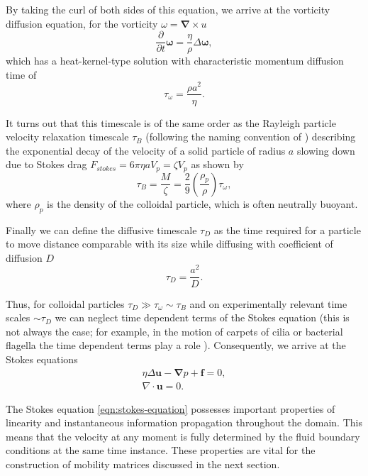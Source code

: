 \documentclass{doctoral}
\newcommand{\pd}{\partial}
\begin{document}
By taking the curl of both sides of this equation, we arrive at the vorticity diffusion equation, for the vorticity $\omega = \bm{\nabla} \times u$
\begin{equation}
    \frac{\pd}{\pd t} \bm{\omega}  = \frac{\eta}{\rho} \Delta \bm{\omega} , \label{eqn:vorticity-diffusion}
\end{equation}
which has a heat-kernel-type solution with characteristic momentum diffusion time of
\begin{equation}
    \tau_\omega = \frac{\rho a^2}{\eta}.
    \label{eqn:vorticity-timescale}
\end{equation}

It turns out that this timescale is of the same order as the Rayleigh particle velocity relaxation timescale $\tau_B$ (following the naming convention of \textcite{vanKampen_2011}) describing the exponential decay of the velocity of a solid particle of radius $a$ slowing down due to Stokes drag $F_{stokes} = 6 \pi \eta a V_p = \zeta V_p$ as shown by
\begin{equation}
    \tau_B = \frac{M}{\zeta} = \frac{2}{9} \left( \frac{\rho_p}{\rho} \right) \tau_\omega, \label{eqn:raighley-timescale}
\end{equation}
where $\rho_p$ is the density of the colloidal particle, which is often neutrally buoyant.

Finally we can define the diffusive timescale $\tau_D$ as the time required for a particle to move distance comparable with its size while diffusing with coefficient of diffusion $D$
\begin{equation}
    \tau_D = \frac{a^2}{D}.
    \label{eqn:diffusive-timescale}
\end{equation}

Thus, for colloidal particles $\tau_D \gg \tau_\omega \sim \tau_B$ and on experimentally relevant time scales $\sim \tau_D$ we can neglect time dependent terms of the Stokes equation (this is not always the case; for example, in the motion of carpets of cilia or bacterial flagella the time dependent terms play a role \cite{Wei_2021}).
Consequently, we arrive at the Stokes equations
\begin{eqnarray}
    \eta \Delta \bm{u} - \bm{\nabla} p + \bm{f} = 0, \label{eqn:stokes-equation} \\
    \nabla \cdot \bm{u} = 0.
\end{eqnarray}

The Stokes equation \eqref{eqn:stokes-equation} possesses important properties of linearity and instantaneous information propagation throughout the domain.
This means that the velocity at any moment is fully determined by the fluid boundary conditions at the same time instance.
These properties are vital for the construction of mobility matrices discussed in the next section.
\end{document}
